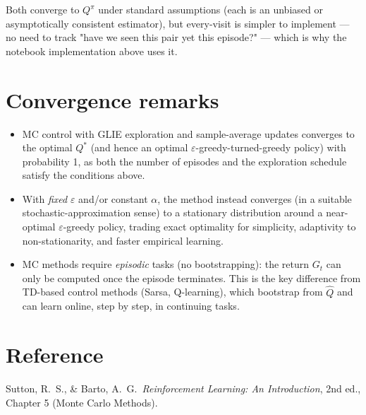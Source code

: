 \documentclass[11pt]{article}
\begin{document}
Both converge to $Q^\pi$ under standard assumptions (each is an unbiased or
asymptotically consistent estimator), but every-visit is simpler to
implement — no need to track "have we seen this pair yet this episode?" —
which is why the notebook implementation above uses it.

\section{Convergence remarks}

\begin{itemize}
    \item MC control with GLIE exploration and sample-average updates
        converges to the optimal $Q^*$ (and hence an optimal
        $\varepsilon$-greedy-turned-greedy policy) with probability 1, as
        both the number of episodes and the exploration schedule satisfy
        the conditions above.
    \item With \emph{fixed} $\varepsilon$ and/or constant $\alpha$, the
        method instead converges (in a suitable stochastic-approximation
        sense) to a stationary distribution around a near-optimal
        $\varepsilon$-greedy policy, trading exact optimality for
        simplicity, adaptivity to non-stationarity, and faster empirical
        learning.
    \item MC methods require \emph{episodic} tasks (no bootstrapping): the
        return $G_t$ can only be computed once the episode terminates.
        This is the key difference from TD-based control methods
        (Sarsa, Q-learning), which bootstrap from $\hat{Q}$ and can learn
        online, step by step, in continuing tasks.
\end{itemize}

\section{Reference}

Sutton, R.\ S., \& Barto, A.\ G.\ \emph{Reinforcement Learning: An
Introduction}, 2nd ed., Chapter 5 (Monte Carlo Methods).
\end{document}
